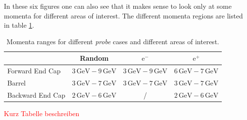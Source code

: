\documentclass[a4paper,11pt,twosided,final,german,openbib,pdftex,listof=totoc,bibliography=totoc]{scrbook}
\begin{document}
In these six figures one can also see that it makes sense to look only at some momenta for different areas of interest. The different momenta regions are listed in table \ref{tab:RTPMDTable}.


\begin{table}[h!]
	\centering
	\begin{tabular}{lccc}
		&Random&$\textrm{e}^-$ &$\textrm{e}^+$\\
		\hline
		Forward End Cap &$3\,\textrm{GeV} - 9\,\textrm{GeV}$&$3\,\textrm{GeV} - 9\,\textrm{GeV}$&$6\,\textrm{GeV} - 7\,\textrm{GeV}$\\
		Barrel &$3\,\textrm{GeV} - 7\,\textrm{GeV}$&$3\,\textrm{GeV} - 7\,\textrm{GeV}$&$3\,\textrm{GeV} - 7\,\textrm{GeV}$\\
		Backward End Cap &$2\,\textrm{GeV} - 6\,\textrm{GeV}$& /&$2\,\textrm{GeV} - 6\,\textrm{GeV}$\\	
	\end{tabular}
	
	\caption[Areas Of Interest Different Momenta Ranges]{Momenta ranges for different \textit{probe} cases and different areas of interest.}
	\label{tab:RTPMDTable}
\end{table}

\textcolor{red}{Kurz Tabelle beschreiben}
\end{document}
